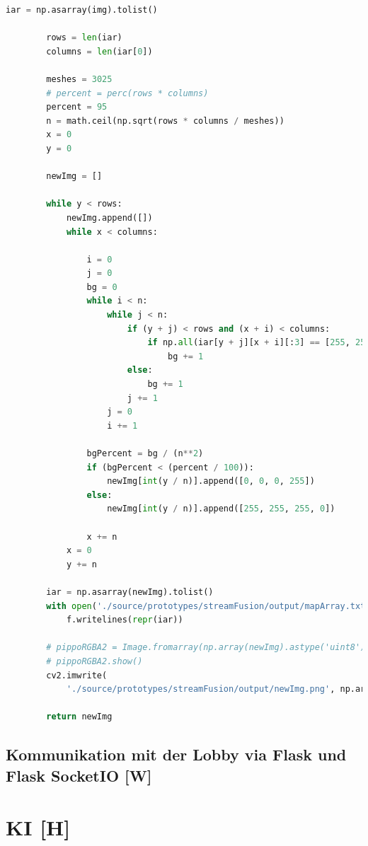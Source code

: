 \begin{lstlisting}[language=Python,label=lst:umsetzung:getArray,firstnumber=21]
        iar = np.asarray(img).tolist()

        rows = len(iar)
        columns = len(iar[0])

        meshes = 3025
        # percent = perc(rows * columns)
        percent = 95
        n = math.ceil(np.sqrt(rows * columns / meshes))
        x = 0
        y = 0

        newImg = []

        while y < rows:
            newImg.append([])
            while x < columns:

                i = 0
                j = 0
                bg = 0
                while i < n:
                    while j < n:
                        if (y + j) < rows and (x + i) < columns:
                            if np.all(iar[y + j][x + i][:3] == [255, 255, 255], 0):
                                bg += 1
                        else:
                            bg += 1
                        j += 1
                    j = 0
                    i += 1

                bgPercent = bg / (n**2)
                if (bgPercent < (percent / 100)):
                    newImg[int(y / n)].append([0, 0, 0, 255])
                else:
                    newImg[int(y / n)].append([255, 255, 255, 0])

                x += n
            x = 0
            y += n

        iar = np.asarray(newImg).tolist()
        with open('./source/prototypes/streamFusion/output/mapArray.txt', 'w') as f:
            f.writelines(repr(iar))

        # pippoRGBA2 = Image.fromarray(np.array(newImg).astype('uint8'), mode='RGBA')
        # pippoRGBA2.show()
        cv2.imwrite(
            './source/prototypes/streamFusion/output/newImg.png', np.array(newImg))

        return newImg

\end{lstlisting}

\subsection{Kommunikation mit der Lobby via Flask und Flask SocketIO [W]}

\section{KI [H]}\label{maai:ai:title}

